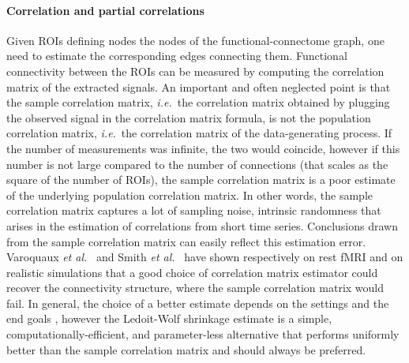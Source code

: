 \documentclass[5p]{elsarticle}
\begin{document}
\paragraph{Correlation and partial correlations}
%
Given ROIs defining nodes the nodes of the functional-connectome graph,
one need to estimate the corresponding edges connecting them.
Functional connectivity between the ROIs can be measured by computing the
correlation matrix of the extracted signals. An important and often
neglected point is that the sample correlation matrix, \emph{i.e.}\ the
correlation matrix obtained by plugging the observed signal in the
correlation matrix formula, is not the population correlation matrix,
\emph{i.e.}\ the correlation matrix of the data-generating process. If the
number of measurements was infinite, the two would coincide, however if
this number is not large compared to the number of connections (that
scales as the square of the number of ROIs), the sample correlation
matrix is a poor estimate of the underlying population correlation
matrix. In other words, the sample correlation matrix captures a lot of
sampling noise, intrinsic randomness that arises in the estimation of
correlations from short time series. Conclusions drawn from the sample
correlation matrix can easily reflect this estimation error.
%
Varoquaux \emph{et al.}~\cite{varoquaux2010c} and Smith \emph{et
al.}~\cite{smith2011} have shown respectively on rest fMRI and on
realistic simulations that a good choice of correlation matrix estimator
could recover the connectivity structure, where the sample correlation
matrix would fail.  In general, the choice of a better estimate depends on
the settings and the end goals \cite{varoquaux2012,varoquaux2010b},
however the Ledoit-Wolf shrinkage estimate \cite{ledoit2004} is a simple,
computationally-efficient, and parameter-less alternative that performs
uniformly better than the sample correlation matrix
\cite{varoquaux2012,varoquaux2010c} and should always be preferred.
\end{document}
